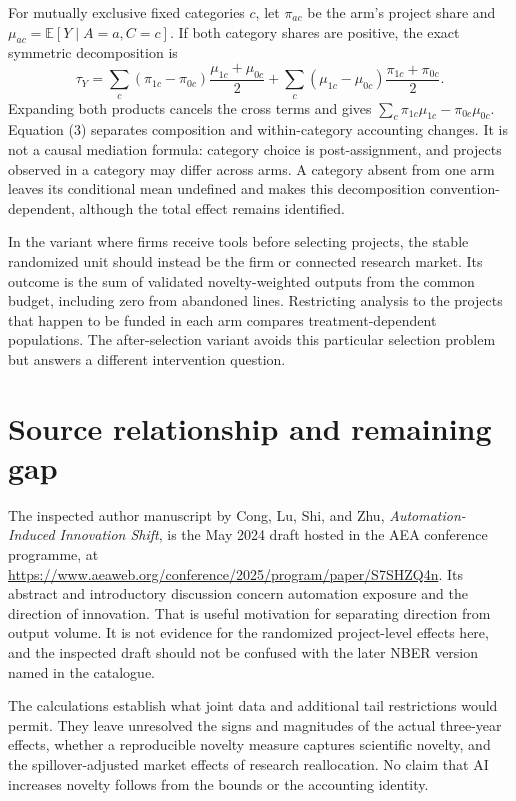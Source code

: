 \documentclass[11pt]{article}
\newcommand{\E}{\mathbb E}
\begin{document}
For mutually exclusive fixed categories $c$, let $\pi_{ac}$ be the arm's project share and $\mu_{ac}=\E[Y\mid A=a,C=c]$. If both category shares are positive, the exact symmetric decomposition is
\[
 \tau_Y=\sum_c (\pi_{1c}-\pi_{0c})\frac{\mu_{1c}+\mu_{0c}}2
       +\sum_c (\mu_{1c}-\mu_{0c})\frac{\pi_{1c}+\pi_{0c}}2.       \tag{3}
\]
Expanding both products cancels the cross terms and gives $\sum_c\pi_{1c}\mu_{1c}-\pi_{0c}\mu_{0c}$. Equation (3) separates composition and within-category accounting changes. It is not a causal mediation formula: category choice is post-assignment, and projects observed in a category may differ across arms. A category absent from one arm leaves its conditional mean undefined and makes this decomposition convention-dependent, although the total effect remains identified.

In the variant where firms receive tools before selecting projects, the stable randomized unit should instead be the firm or connected research market. Its outcome is the sum of validated novelty-weighted outputs from the common budget, including zero from abandoned lines. Restricting analysis to the projects that happen to be funded in each arm compares treatment-dependent populations. The after-selection variant avoids this particular selection problem but answers a different intervention question.

\section*{Source relationship and remaining gap}
The inspected author manuscript by Cong, Lu, Shi, and Zhu, \emph{Automation-Induced Innovation Shift}, is the May 2024 draft hosted in the AEA conference programme, at
\url{https://www.aeaweb.org/conference/2025/program/paper/S7SHZQ4n}.
Its abstract and introductory discussion concern automation exposure and the direction of innovation. That is useful motivation for separating direction from output volume. It is not evidence for the randomized project-level effects here, and the inspected draft should not be confused with the later NBER version named in the catalogue.

The calculations establish what joint data and additional tail restrictions would permit. They leave unresolved the signs and magnitudes of the actual three-year effects, whether a reproducible novelty measure captures scientific novelty, and the spillover-adjusted market effects of research reallocation. No claim that AI increases novelty follows from the bounds or the accounting identity.
\end{document}
